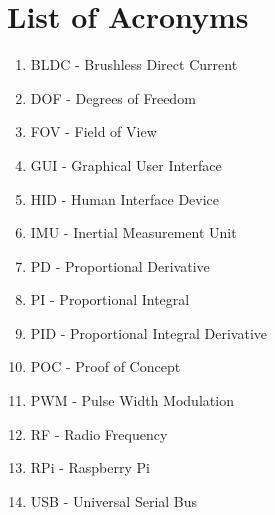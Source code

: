 \section{List of Acronyms}
\begin{enumerate}
	\item BLDC - Brushless Direct Current
	\item DOF - Degrees of Freedom
	\item FOV - Field of View
	\item GUI - Graphical User Interface
	\item HID - Human Interface Device
	\item IMU - Inertial Measurement Unit
	\item PD - Proportional Derivative
	\item PI - Proportional Integral
	\item PID - Proportional Integral Derivative
	\item POC - Proof of Concept
	\item PWM - Pulse Width Modulation
	\item RF - Radio Frequency
	\item RPi - Raspberry Pi
	\item USB - Universal Serial Bus
\end{enumerate}
